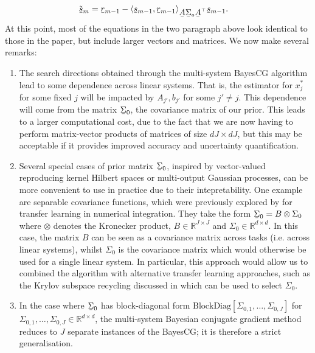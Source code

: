 \documentclass[twoside]{article}
\newcommand\barbelow[1]{\stackunder[1.2pt]{$#1$}{\rule{.8ex}{.075ex}}}
\begin{document}
\begin{align*}
	\tilde{\barbelow{s}}_m & = \barbelow{r}_{m-1} - \langle \barbelow{s}_{m-1}, \barbelow{r}_{m-1} \rangle_{ \barbelow{A}\barbelow{\Sigma}_0 \barbelow{A}^\top} \barbelow{s}_{m-1}.
\end{align*}
At this point, most of the equations in the two paragraph above look identical to those in the paper, but include larger vectors and matrices. We now make several remarks:
\begin{enumerate}

	\item The search directions obtained through the multi-system BayesCG algorithm lead to some dependence across linear systems. That is, the estimator for $x_j^*$ for some fixed $j$ will be impacted by $A_{j'},b_{j'}$ for some $j' \neq j$. This dependence will come from the matrix $\barbelow{\Sigma}_0$, the covariance matrix of our prior. This leads to a larger computational cost, due to the fact that we are now having to perform matrix-vector products of matrices of size $dJ \times dJ$, but this may be acceptable if it provides improved accuracy and uncertainty quantification.

	\item Several special cases of prior matrix $\barbelow{\Sigma}_0$, inspired by vector-valued reproducing kernel Hilbert spaces or multi-output Gaussian processes, can be more convenient to use in practice due to their intepretability. One example are separable covariance functions, which were previously explored by \cite{Xi2018MultiOutput} for transfer learning in numerical integration. They take the form $\barbelow{\Sigma}_{0}= B \otimes \Sigma_{0}$ where $\otimes$ denotes the Kronecker product, $B \in \mathbb{R}^{J \times J}$ and $\Sigma_0 \in \mathbb{R}^{d \times d}$. In this case, the matrix $B$ can be seen as a covariance matrix across tasks (i.e. across linear systems), whilst $\Sigma_0$ is the covariance matrix which would otherwise be used for a single linear system. In particular, this approach would allow us to combined the algorithm with alternative transfer learning approaches, such as the Krylov subspace recycling discussed in \cite{DeRoos2017} which can be used to select $\Sigma_0$.

	\item In the case where $\barbelow{\Sigma}_0$ has block-diagonal form $\text{BlockDiag}\left[\Sigma_{0,1},\ldots,\Sigma_{0,J}\right]$ for $\Sigma_{0,1},\ldots,\Sigma_{0,J} \in \mathbb{R}^{d \times d}$, the multi-system Bayesian conjugate gradient method reduces to $J$ separate instances of the BayesCG; it is therefore a strict generalisation.



\end{enumerate}
\end{document}
